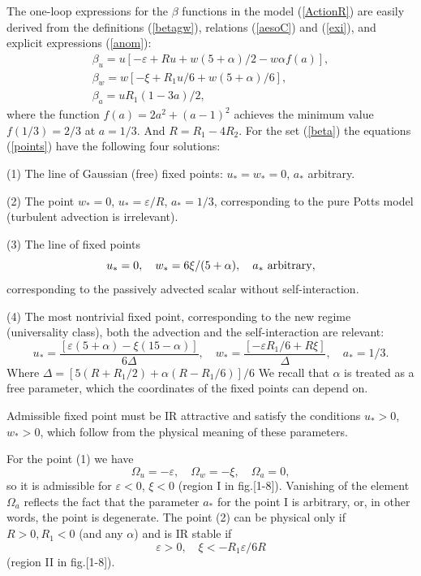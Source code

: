 \documentclass[12pt]{article}
\begin{document}
The one-loop expressions for the $\beta$ functions in the model
(\ref{ActionR}) are easily derived from the definitions
(\ref{betagw}), relations (\ref{aesoC}) and (\ref{exi}),
and explicit expressions (\ref{anom}):
\begin{eqnarray}
\beta_{u} = u \left[ -\varepsilon+ Ru + w(5+\alpha)/2 -w\alpha f(a) \right],
\nonumber \\
\beta_{w} = w \left[ -\xi +R_1 u/6 + w(5+\alpha)/6 \right],
\nonumber \\
\beta_{a} = uR_1(1-3a)/2,
\label{beta}
\end{eqnarray}
where the function $f(a)=2a^{2}+(a-1)^{2}$ achieves the minimum value
$f(1/3) =2/3$ at $a=1/3$. And $R=R_1-4R_2$. For the set (\ref{beta}) the equations
(\ref{points}) have the following four solutions:

(1) The line of Gaussian (free) fixed points: $u_{*}=w_{*}=0$, $a_{*}$
arbitrary.

(2) The point $w_{*}=0$, $u_{*}=\varepsilon/R$, $a_{*}=1/3$, corresponding
to the pure Potts model (turbulent advection is irrelevant).

(3) The line of fixed points
\begin{equation}
u_{*}=0, \quad w_{*}=6\xi/(5+\alpha), \quad  a_{*} \ {\rm arbitrary},
\label{line3}
\end{equation}
corresponding to the passively advected scalar without self-interaction.

(4) The most nontrivial fixed point, corresponding to the new regime
(universality class), both the advection and the self-interaction are
relevant:
\begin{equation}
u_{*} = \frac{[\varepsilon(5+\alpha)-\xi(15-\alpha)]}{6 \Delta}, \quad
w_{*} = \frac{[-\varepsilon R_1/6+R\xi]}{\Delta}, \quad a_{*}=1/3.
\label{wu4}
\end{equation}
Where $\Delta=[5(R+R_1/2)+\alpha(R-R_1/6)]/6$
We recall that $\alpha$ is treated as a free parameter, which the
coordinates of the fixed points can depend on.

Admissible fixed point must be IR attractive and satisfy the conditions
$u_{*}>0$, $w_{*}>0$, which follow from the physical meaning of these
parameters. 

For the point (1) we have
\[ \Omega_{u} = -\varepsilon, \quad  \Omega_{w} = -\xi, \quad \Omega_{a} = 0, \]
so it is admissible for $\varepsilon<0$, $\xi<0$ (region I in
fig.[1-8]). Vanishing of the element $\Omega_{a}$ reflects the
fact that the parameter $a_{*}$ for the point I is arbitrary, or, in other
words, the point is degenerate.
The point (2) can be physical only if $R>0, R_1<0$ (and any $\alpha$) and 
is IR stable if
 \[ \varepsilon>0,\quad \xi<-R_1\varepsilon/6R \]
(region II in fig.[1-8]).
\end{document}
